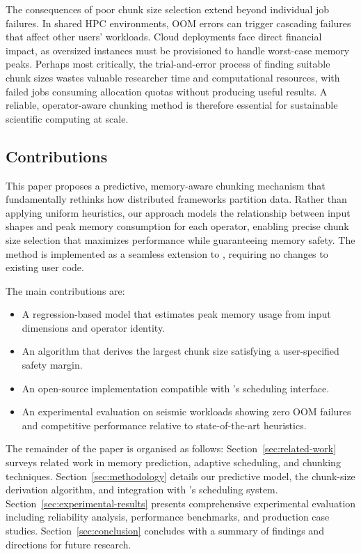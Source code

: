 The consequences of poor chunk size selection extend beyond individual job failures.
In shared \ac{HPC} environments, \ac{OOM} errors can trigger cascading failures that affect other users' workloads.
Cloud deployments face direct financial impact, as oversized instances must be provisioned to handle worst-case memory peaks.
Perhaps most critically, the trial-and-error process of finding suitable chunk sizes wastes valuable researcher time and computational resources, with failed jobs consuming allocation quotas without producing useful results.
A reliable, operator-aware chunking method is therefore essential for sustainable scientific computing at scale.

\subsection{Contributions}

This paper proposes a predictive, memory-aware chunking mechanism that fundamentally rethinks how distributed frameworks partition data.
Rather than applying uniform heuristics, our approach models the relationship between input shapes and peak memory consumption for each operator, enabling precise chunk size selection that maximizes performance while guaranteeing memory safety.
The method is implemented as a seamless extension to \dask, requiring no changes to existing user code.

The main contributions are:

\begin{itemize}
    \item A regression-based model that estimates peak memory usage from input dimensions and operator identity.
    \item An algorithm that derives the largest chunk size satisfying a user-specified safety margin.
    \item An open-source implementation compatible with \dask's scheduling interface.
    \item An experimental evaluation on seismic workloads showing zero OOM failures and competitive performance relative to state-of-the-art heuristics.
\end{itemize}

The remainder of the paper is organised as follows: 
Section~\ref{sec:related-work} surveys related work in memory prediction, adaptive scheduling, and chunking techniques.
Section~\ref{sec:methodology} details our predictive model, the chunk-size derivation algorithm, and integration with \dask's scheduling system.
Section~\ref{sec:experimental-results} presents comprehensive experimental evaluation including reliability analysis, performance benchmarks, and production case studies.
Section~\ref{sec:conclusion} concludes with a summary of findings and directions for future research.